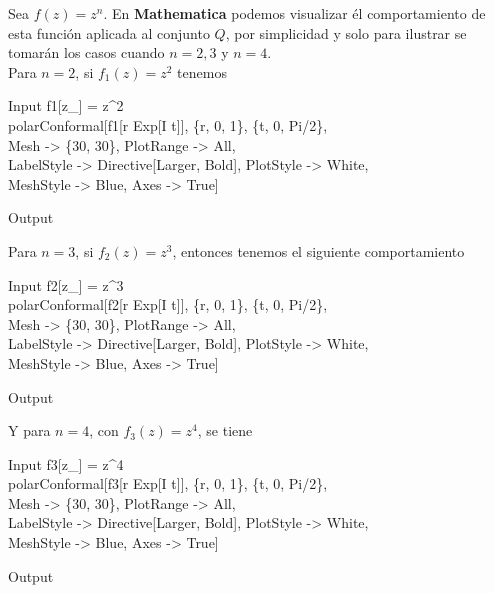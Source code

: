 \begin{Ejem}
	Sea $f(z)=z^{n}$. En \textbf{Mathematica} podemos visualizar él comportamiento de esta función aplicada al conjunto $Q$, por simplicidad y  solo para ilustrar se tomarán los casos cuando $n=2,3$ y $n=4$.\\
Para $n=2$, si $f_1(z)=z^2$ tenemos
\begin{mmaCell}{Input}
	 f1[z_] = z^2 \\polarConformal[f1[r Exp[I t]], \{r, 0, 1\}, \{t, 0, Pi/2\},\\Mesh -> \{30, 30\}, PlotRange -> All,\\LabelStyle -> Directive[Larger, Bold], PlotStyle -> White,\\MeshStyle -> Blue, Axes -> True]
\end{mmaCell}
\begin{mmaCell}[moregraphics={moreig={scale=0.7}}]{Output}
\end{mmaCell}
Para $n=3$, si $f_2(z)=z^3$, entonces  tenemos el siguiente comportamiento
\begin{mmaCell}{Input}
	 f2[z_] = z^3 \\polarConformal[f2[r Exp[I t]], \{r, 0, 1\}, \{t, 0, Pi/2\},\\Mesh -> \{30, 30\}, PlotRange -> All,\\LabelStyle -> Directive[Larger, Bold], PlotStyle -> White,\\MeshStyle -> Blue, Axes -> True]
\end{mmaCell}
\begin{mmaCell}[moregraphics={moreig={scale=0.7}}]{Output}
\end{mmaCell}
Y para $n=4$, con $f_3(z)=z^4$, se tiene 
\begin{mmaCell}{Input}
	 f3[z_] = z^4 \\polarConformal[f3[r Exp[I t]], \{r, 0, 1\}, \{t, 0, Pi/2\},\\Mesh -> \{30, 30\}, PlotRange -> All,\\LabelStyle -> Directive[Larger, Bold], PlotStyle -> White,\\MeshStyle -> Blue, Axes -> True]
\end{mmaCell}
\begin{mmaCell}[moregraphics={moreig={scale=0.7}}]{Output}
\end{mmaCell}

\end{Ejem}


